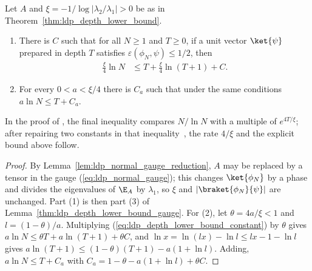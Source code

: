 
\begin{corollary}
    \label{thm:ldp_depth_lower_bound_constant}
    \leanok
    Let $A$ and $\xi=-1/\log\lvert\lambda_2/\lambda_1\rvert>0$ be as in
    Theorem~\ref{thm:ldp_depth_lower_bound}.
    \begin{enumerate}
        \item There is $C$ such that for all $N\ge1$ and $T\ge0$, if a unit
              vector $\ket{\psi}$ prepared in depth $T$ satisfies
              $\varepsilon(\phi_N,\psi)\le1/2$, then
              \begin{align}
                  \frac\xi4\ln N
                   & \le T+\frac\xi4\ln(T+1)+C.
                  \label{eq:ldp_depth_lower_bound_constant}
              \end{align}
        \item For every $0<a<\xi/4$ there is $C_a$ such that under the same
              conditions $a\ln N\le T+C_a$.
    \end{enumerate}
    In the proof of \cite[Theorem~1]{Malz2024Preparation}, the final inequality
    compares $N/\ln N$ with a multiple of $e^{4T/\xi}$; after repairing two
    constants in that inequality~\cite{gap:mswc24_depth_lower_bound_constant},
    the rate $4/\xi$ and the explicit bound above follow.
\end{corollary}
\begin{proof}
    \leanok
    By Lemma~\ref{lem:ldp_normal_gauge_reduction}, $A$ may be replaced by a
    tensor in the gauge (\ref{eq:ldp_normal_gauge}); this changes
    $\ket{\phi_N}$ by a phase and divides the eigenvalues of $\E_A$ by
    $\lambda_1$, so $\xi$ and $\lvert\braket{\phi_N}{\psi}\rvert$ are
    unchanged. Part (1) is then part (3) of
    Lemma~\ref{thm:ldp_depth_lower_bound_gauge}. For (2), let
    $\theta=4a/\xi<1$ and $l=(1-\theta)/a$. Multiplying
    (\ref{eq:ldp_depth_lower_bound_constant}) by $\theta$ gives
    $a\ln N\le\theta T+a\ln(T+1)+\theta C$, and
    $\ln x=\ln(lx)-\ln l\le lx-1-\ln l$ gives
    $a\ln(T+1)\le(1-\theta)(T+1)-a(1+\ln l)$. Adding,
    $a\ln N\le T+C_a$ with $C_a=1-\theta-a(1+\ln l)+\theta C$.
\end{proof}

